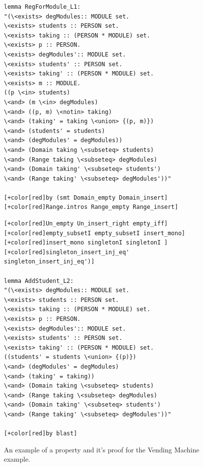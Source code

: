 \begin{figure}[H]
\centering
\begin{minipage}{0.45\textwidth}
\centering
\begin{scriptsize}
\begin{BVerbatim}[commandchars=+\[\]]
lemma RegForModule_L1:
"(\<exists> degModules:: MODULE set.
\<exists> students :: PERSON set.
\<exists> taking :: (PERSON * MODULE) set.
\<exists> p :: PERSON.
\<exists> degModules':: MODULE set.
\<exists> students' :: PERSON set.
\<exists> taking' :: (PERSON * MODULE) set.
\<exists> m :: MODULE.
((p \<in> students) 
\<and> (m \<in> degModules) 
\<and> ((p, m) \<notin> taking)
\<and> (taking' = taking \<union> {(p, m)}) 
\<and> (students' = students) 
\<and> (degModules' = degModules))
\<and> (Domain taking \<subseteq> students)
\<and> (Range taking \<subseteq> degModules)
\<and> (Domain taking' \<subseteq> students')
\<and> (Range taking' \<subseteq> degModules'))"

[+color[red]by (smt Domain_empty Domain_insert]
[+color[red]Range.intros Range_empty Range_insert]
\end{BVerbatim}
\end{scriptsize}
\end{minipage}\hfill
\begin{minipage}{0.45\textwidth}
\begin{scriptsize}
\begin{BVerbatim}[commandchars=+\[\]]
[+color[red]Un_empty Un_insert_right empty_iff]
[+color[red]empty_subsetI empty_subsetI insert_mono]
[+color[red]insert_mono singletonI singletonI ]
[+color[red]singleton_insert_inj_eq' singleton_insert_inj_eq')]

lemma AddStudent_L2:
"(\<exists> degModules:: MODULE set.
\<exists> students :: PERSON set.
\<exists> taking :: (PERSON * MODULE) set.
\<exists> p :: PERSON.
\<exists> degModules':: MODULE set.
\<exists> students' :: PERSON set.
\<exists> taking' :: (PERSON * MODULE) set.
((students' = students \<union> {(p)}) 
\<and> (degModules' = degModules) 
\<and> (taking' = taking))
\<and> (Domain taking \<subseteq> students)
\<and> (Range taking \<subseteq> degModules)
\<and> (Domain taking' \<subseteq> students')
\<and> (Range taking' \<subseteq> degModules'))"

[+color[red]by blast]
\end{BVerbatim}
\end{scriptsize}
\end{minipage}
\caption{An example of a property and it's proof for the Vending Machine example. \label{fig:propertyproof}}
\end{figure}

